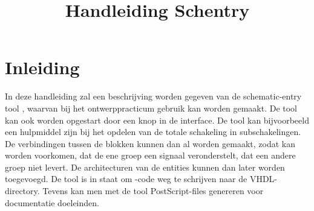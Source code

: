 \title{Handleiding Schentry}
\maketitle
{}
\label{app_schentry}

\section{Inleiding}
In deze handleiding zal een beschrijving worden gegeven van de schematic-entry tool ,
waarvan bij het ontwerppracticum gebruik kan worden gemaakt.
De tool kan ook worden opgestart door een knop in de  interface.
De  tool kan bijvoorbeeld een hulpmiddel zijn bij het opdelen van de totale schakeling
in subschakelingen. De verbindingen tussen de blokken kunnen dan al worden
gemaakt, zodat kan worden voorkomen, dat de ene groep een signaal
veronderstelt, dat een andere groep niet levert. De architecturen van de
entities kunnen dan later worden toegevoegd.
De tool is in staat om -code weg te schrijven naar de VHDL-directory.
Tevens kan men met de tool PostScript-files genereren voor documentatie doeleinden.

